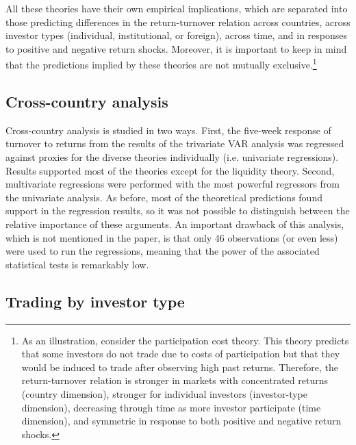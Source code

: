 \documentclass[final,3p,times,twocolumn]{elsarticle}
\begin{document}
All these theories have their own empirical implications, which are separated into those predicting differences in the return-turnover relation across countries, across investor types (individual, institutional, or foreign), across time, and in responses to positive and negative return shocks. Moreover, it is important to keep in mind that the predictions implied by these theories are not mutually exclusive.\footnote{As an illustration, consider the participation cost theory. This theory predicts that some investors do not trade due to costs of participation but that they would be  induced to trade after observing high past returns. Therefore, the return-turnover relation is stronger in markets with concentrated returns (country dimension), stronger for individual investors (investor-type dimension), decreasing through time as more investor participate (time dimension), and symmetric in response to both positive and negative return shocks.}\par 


\subsection{Cross-country analysis}

Cross-country analysis is studied in two ways. First, the five-week response of turnover to returns from the results of the trivariate VAR analysis was regressed against proxies for the diverse theories individually (i.e. univariate regressions). Results supported most of the theories except for the liquidity theory. Second, multivariate regressions were performed with the most powerful regressors from the univariate analysis. As before, most of the theoretical predictions found support in the regression results, so it was not possible to distinguish between the relative importance of these arguments. An important drawback of this analysis, which is not mentioned in the paper, is that only 46 observations (or even less) were used to run the regressions, meaning that the power of the associated statistical tests is remarkably low.\par


\subsection{Trading by investor type}
\end{document}
